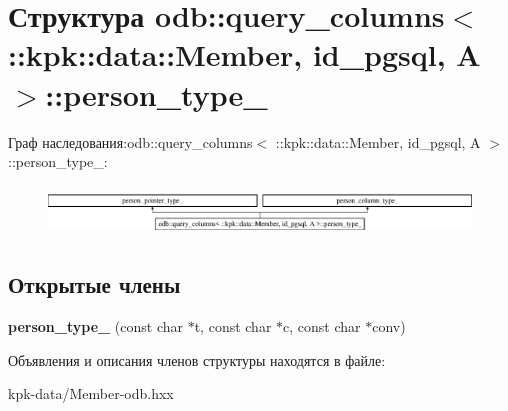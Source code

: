 \hypertarget{structodb_1_1query__columns_3_01_1_1kpk_1_1data_1_1_member_00_01id__pgsql_00_01_a_01_4_1_1person__type__}{}\section{Структура odb\+:\+:query\+\_\+columns$<$ \+:\+:kpk\+:\+:data\+:\+:Member, id\+\_\+pgsql, A $>$\+:\+:person\+\_\+type\+\_\+}
\label{structodb_1_1query__columns_3_01_1_1kpk_1_1data_1_1_member_00_01id__pgsql_00_01_a_01_4_1_1person__type__}
Граф наследования\+:odb\+:\+:query\+\_\+columns$<$ \+:\+:kpk\+:\+:data\+:\+:Member, id\+\_\+pgsql, A $>$\+:\+:person\+\_\+type\+\_\+\+:\begin{figure}[H]
\begin{center}
\leavevmode
\includegraphics[height=1.336515cm]{structodb_1_1query__columns_3_01_1_1kpk_1_1data_1_1_member_00_01id__pgsql_00_01_a_01_4_1_1person__type__}
\end{center}
\end{figure}
\subsection*{Открытые члены}
\begin{DoxyCompactItemize}
\item 
{\bfseries person\+\_\+type\+\_\+} (const char $\ast$t, const char $\ast$c, const char $\ast$conv)\hypertarget{structodb_1_1query__columns_3_01_1_1kpk_1_1data_1_1_member_00_01id__pgsql_00_01_a_01_4_1_1person__type___abe95ac7700e69c7b1d5e2148d8b4ccd2}{}\label{structodb_1_1query__columns_3_01_1_1kpk_1_1data_1_1_member_00_01id__pgsql_00_01_a_01_4_1_1person__type___abe95ac7700e69c7b1d5e2148d8b4ccd2}

\end{DoxyCompactItemize}


Объявления и описания членов структуры находятся в файле\+:\begin{DoxyCompactItemize}
\item 
kpk-\/data/Member-\/odb.\+hxx\end{DoxyCompactItemize}
